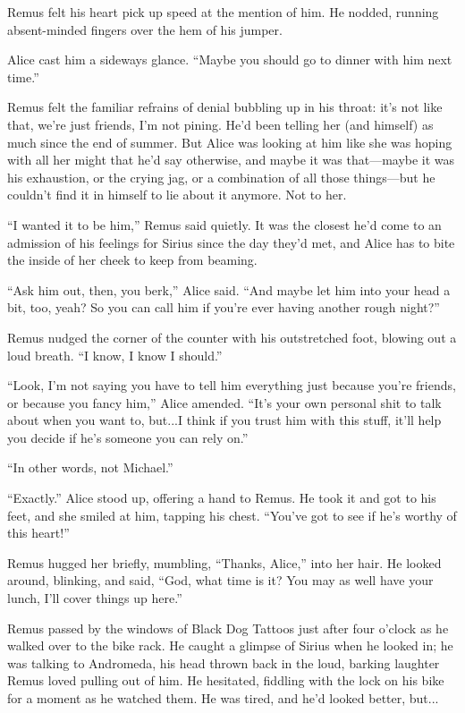 Remus felt his heart pick up speed at the mention of him. He nodded, running absent-minded fingers over the hem of his jumper.

Alice cast him a sideways glance. “Maybe you should go to dinner with him next time.”

Remus felt the familiar refrains of denial bubbling up in his throat: it’s not like that, we’re just friends, I’m not pining. He’d been telling her (and himself) as much since the end of summer. But Alice was looking at him like she was hoping with all her might that he’d say otherwise, and maybe it was that—maybe it was his exhaustion, or the crying jag, or a combination of all those things—but he couldn’t find it in himself to lie about it anymore. Not to her.

“I wanted it to be him,” Remus said quietly. It was the closest he’d come to an admission of his feelings for Sirius since the day they’d met, and Alice has to bite the inside of her cheek to keep from beaming.

“Ask him out, then, you berk,” Alice said. “And maybe let him into your head a bit, too, yeah? So you can call him if you’re ever having another rough night?”

Remus nudged the corner of the counter with his outstretched foot, blowing out a loud breath. “I know, I know I should.”

“Look, I’m not saying you have to tell him everything just because you’re friends, or because you fancy him,” Alice amended. “It’s your own personal shit to talk about when you want to, but...I think if you trust him with this stuff, it’ll help you decide if he’s someone you can rely on.”

“In other words, not Michael.”

“Exactly.” Alice stood up, offering a hand to Remus. He took it and got to his feet, and she smiled at him, tapping his chest. “You’ve got to see if he’s worthy of this heart!”

Remus hugged her briefly, mumbling, “Thanks, Alice,” into her hair. He looked around, blinking, and said, “God, what time is it? You may as well have your lunch, I’ll cover things up here.”

Remus passed by the windows of Black Dog Tattoos just after four o'clock as he walked over to the bike rack. He caught a glimpse of Sirius when he looked in; he was talking to Andromeda, his head thrown back in the loud, barking laughter Remus loved pulling out of him. He hesitated, fiddling with the lock on his bike for a moment as he watched them. He was tired, and he'd looked better, but...

